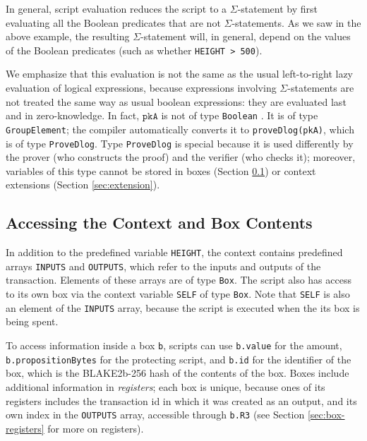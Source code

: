 \documentclass[11pt]{article}
\newcommand{\authnote}[2]{\marginpar{\parbox{\marginparwidth}{\tiny %
  \textsf{#1 {\textcolor{blue}{notes: #2}}}}}%
  \textcolor{blue}{\textbf{\dag}}}
\newcommand{\authnote}[2]{
  \textsf{#1 \textcolor{blue}{: #2}}}
\newcommand{\authnote}[2]{}
\newcommand{\lnote}[1]{{\authnote{\textcolor{orange}{Leo notes}}{#1}}}
\begin{document}
In general, script evaluation reduces the script to a $\Sigma$-statement by first evaluating all the Boolean predicates that are not $\Sigma$-statements. As we saw in the above example, the resulting $\Sigma$-statement will, in general, depend on the values of the Boolean predicates (such as whether \texttt{HEIGHT > 500}).

We emphasize that this evaluation is not the same as the usual left-to-right lazy evaluation of logical expressions, because expressions involving $\Sigma$-statements are not treated the same way as usual boolean expressions: they are evaluated last and in zero-knowledge. In fact, $\texttt{pkA}$ is not of type \texttt{Boolean} \lnote{do we use \texttt{Boolean} or \texttt{Bool}?}. It is of type \texttt{GroupElement}; the compiler automatically converts it to \texttt{proveDlog(\texttt{pkA})}, which is of type \texttt{ProveDlog}. Type   \texttt{ProveDlog} is special because it is used differently by the prover (who constructs the proof) and the verifier (who checks it); moreover, variables of this type cannot be stored in boxes (Section \ref{sec:context}) or context extensions (Section \ref{sec:extension}). \lnote{the type system is undergoing changes, so this needs fixing}


\lnote{Should we have an example with fees? According to Dima, fees are implemented as boxes with TrueLeaf as a proposition, last transaction in a block consumes all this just created boxes and in favor of miner.}


\subsection{Accessing the Context and Box Contents}
\label{sec:context}
In addition to the predefined variable \texttt{HEIGHT}, the context contains predefined arrays \texttt{INPUTS} and \texttt{OUTPUTS}, which refer to the inputs and outputs of the transaction. Elements of these arrays are of type \texttt{Box}. The script also has access to its own box via the context variable \texttt{SELF} of type \texttt{Box}. Note that \texttt{SELF} is also an element of the \texttt{INPUTS} array, because the script is executed when the its box is being spent.

To access information inside a box \texttt{b}, scripts can use \texttt{b.value} for the amount, \texttt{b.propositionBytes} for the protecting script, and \texttt{b.id} for the identifier of the box, which is the BLAKE2b-256 hash of the contents of the box. Boxes include additional information in \emph{registers};  each box is unique, because ones of its registers includes the transaction id in which it was created as an output, and its own index in the \texttt{OUTPUTS} array, accessible through \texttt{b.R3} (see Section \ref{sec:box-registers} for more on registers).
\end{document}
